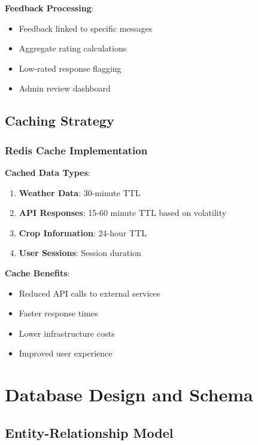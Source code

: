 \documentclass[12pt,a4paper]{article}
\begin{document}
\textbf{Feedback Processing}:
\begin{itemize}[leftmargin=*]
    \item Feedback linked to specific messages
    \item Aggregate rating calculations
    \item Low-rated response flagging
    \item Admin review dashboard
\end{itemize}

\subsection{Caching Strategy}

\subsubsection{Redis Cache Implementation}

\textbf{Cached Data Types}:
\begin{enumerate}[leftmargin=*]
    \item \textbf{Weather Data}: 30-minute TTL
    \item \textbf{API Responses}: 15-60 minute TTL based on volatility
    \item \textbf{Crop Information}: 24-hour TTL
    \item \textbf{User Sessions}: Session duration
\end{enumerate}

\textbf{Cache Benefits}:
\begin{itemize}[leftmargin=*]
    \item Reduced API calls to external services
    \item Faster response times
    \item Lower infrastructure costs
    \item Improved user experience
\end{itemize}

\section{Database Design and Schema}

\subsection{Entity-Relationship Model}
\end{document}
